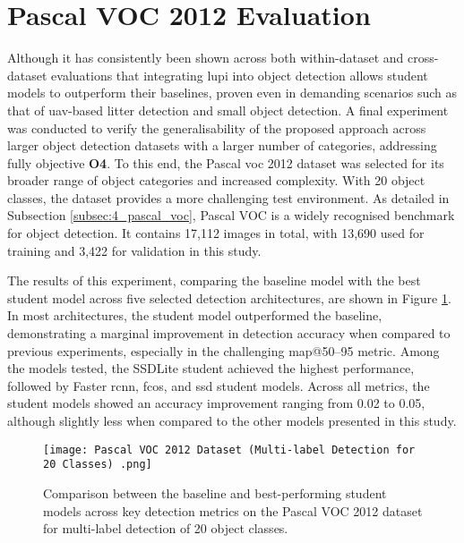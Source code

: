 \section{Pascal VOC 2012 Evaluation}
\label{sec:5_pascal_voc_dataset_exp}

Although it has consistently been shown across both within-dataset and cross-dataset evaluations that integrating \gls{lupi} into object detection allows student models to outperform their baselines, proven even in demanding scenarios such as that of \gls{uav}-based litter detection and small object detection. A final experiment was conducted to verify the generalisability of the proposed approach across larger object detection datasets with a larger number of categories, addressing fully objective \textbf{O4}. To this end, the Pascal \gls{voc} 2012 dataset was selected for its broader range of object categories and increased complexity. With 20 object classes, the dataset provides a more challenging test environment. As detailed in Subsection \ref{subsec:4_pascal_voc}, Pascal VOC is a widely recognised benchmark for object detection. It contains 17,112 images in total, with 13,690 used for training and 3,422 for validation in this study.

The results of this experiment, comparing the baseline model with the best student model across five selected detection architectures, are shown in Figure \ref{fig:pascal_voc_bar}. In most architectures, the student model outperformed the baseline, demonstrating a marginal improvement in detection accuracy when compared to previous experiments, especially in the challenging \gls{map}@50–95 metric. Among the models tested, the SSDLite student achieved the highest performance, followed by Faster \gls{rcnn}, \gls{fcos}, and \gls{ssd} student models. Across all metrics, the student models showed an accuracy improvement ranging from 0.02 to 0.05, although slightly less when compared to the other models presented in this study.

\begin{figure}[!htbp]
    \centering
    \texttt{[image: Pascal VOC 2012 Dataset (Multi-label Detection for 20 Classes) .png]}
    \caption{Comparison between the baseline and best-performing student models across key detection metrics on the Pascal VOC 2012 dataset for multi-label detection of 20 object classes.}
    \label{fig:pascal_voc_bar}
\end{figure}

